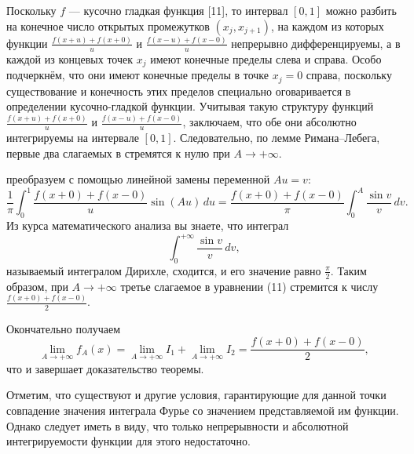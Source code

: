 {Поскольку \( f \) — кусочно гладкая функция [11], то интервал \( [0, 1] \) можно разбить на конечное число открытых промежутков \( (x_j, x_{j+1}) \), на каждом из которых функции \( \frac{f(x + u) + f(x + 0)}{u} \) и \( \frac{f(x - u) + f(x - 0)}{u} \) непрерывно дифференцируемы, а в каждой из концевых точек \( x_j \) имеют конечные пределы слева и справа. Особо подчеркнём, что они имеют конечные пределы в точке \( x_j = 0 \) справа, поскольку существование и конечность этих пределов специально оговаривается в определении кусочно-гладкой функции. Учитывая такую структуру функций \( \frac{f(x + u) + f(x + 0)}{u} \) и \( \frac{f(x - u) + f(x - 0)}{u} \), заключаем, что обе они абсолютно интегрируемы на интервале \( [0, 1] \). Следовательно, по лемме Римана–Лебега, первые два слагаемых в  стремятся к нулю при \( A \to +\infty \). 


преобразуем с помощью линейной замены переменной \( Au = v \):
\[
\frac{1}{\pi} \int_0^1 \frac{f(x+0) + f(x-0)}{u} \sin(Au) \, du = \frac{f(x+0) + f(x-0)}{\pi} \int_0^A \frac{\sin v}{v} \, dv. \tag{1.43}
\]
Из курса математического анализа вы знаете, что интеграл
\[
\int_0^{+\infty} \frac{\sin v}{v} \, dv, \tag{1.44}
\]
называемый интегралом Дирихле, сходится, и его значение равно \( \frac{\pi}{2} \). Таким образом, при \( A \to +\infty \) третье слагаемое в уравнении (11) стремится к числу \( \frac{f(x+0) + f(x-0)}{2} \).

Окончательно получаем
\[
\lim_{A \to +\infty} f_A(x) = \lim_{A \to +\infty} I_1 + \lim_{A \to +\infty} I_2 = \frac{f(x+0) + f(x-0)}{2}, \tag{1.45}
\]
что и завершает доказательство теоремы.

Отметим, что существуют и другие условия, гарантирующие для данной точки совпадение значения интеграла Фурье со значением представляемой им функции. Однако следует иметь в виду, что только непрерывности и абсолютной интегрируемости функции для этого недостаточно.



}

